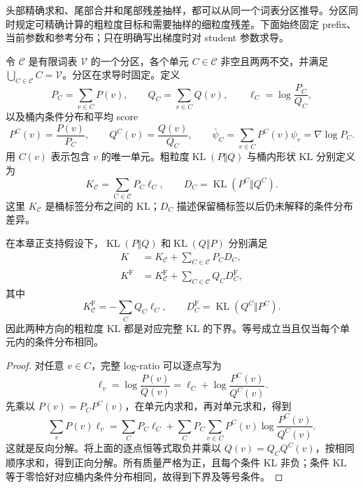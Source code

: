 \documentclass[lang=cn,scheme=chinese,openany]{../book/elegantbook}
\newcommand{\KL}{\operatorname{KL}}
\begin{document}
头部精确求和、尾部合并和尾部残差抽样，都可以从同一个词表分区推导。分区同时规定可精确计算的粗粒度目标和需要抽样的细粒度残差。下面始终固定 prefix、当前参数和参考分布；只在明确写出梯度时对 student 参数求导。

\begin{definition}[词表分区与桶内分布]
令 $\mathcal C$ 是有限词表 $\mathcal V$ 的一个分区，各个单元 $C\in\mathcal C$ 非空且两两不交，并满足 $\bigcup_{C\in\mathcal C}C=\mathcal V$。分区在求导时固定。定义
\begin{equation*}
 P_C=\sum_{v\in C}P(v),\qquad
 Q_C=\sum_{v\in C}Q(v),\qquad
 \ell_C=\log\frac{P_C}{Q_C},
\end{equation*}
以及桶内条件分布和平均 score
\begin{equation*}
 P^C(v)=\frac{P(v)}{P_C},\qquad
 Q^C(v)=\frac{Q(v)}{Q_C},\qquad
 \bar \psi_C=\sum_{v\in C}P^C(v)\psi_v=\nabla\log P_C.
\end{equation*}
用 $C(v)$ 表示包含 $v$ 的唯一单元。粗粒度$\KL(P\Vert Q)$ 与桶内形状 KL 分别定义为
\begin{equation*}
 K_{\mathcal C}=\sum_{C\in\mathcal C}P_C\ell_C,
 \qquad D_C=\KL(P^C\Vert Q^C).
\end{equation*}
这里 $K_{\mathcal C}$ 是桶标签分布之间的 KL；$D_C$ 描述保留桶标签以后仍未解释的条件分布差异。
\end{definition}

\begin{theorem}
\label{inf:thm:kl-partition-chain}
在本章正支持假设下，$\KL(P\Vert Q)$ 和$\KL(Q\Vert P)$ 分别满足
\begin{align}
 K&=K_{\mathcal C}+\sum_{C\in\mathcal C}P_CD_C,
 \label{inf:eq:kl-partition-chain-reverse}\\
 K^{\mathrm F}&=K^{\mathrm F}_{\mathcal C}
       +\sum_{C\in\mathcal C}Q_CD^{\mathrm F}_C,
 \label{inf:eq:kl-partition-chain-forward}
\end{align}
其中
\begin{equation*}
 K^{\mathrm F}_{\mathcal C}=-\sum_CQ_C\ell_C,
 \qquad D_C^{\mathrm F}=\KL(Q^C\Vert P^C).
\end{equation*}
因此两种方向的粗粒度 KL 都是对应完整 KL 的下界。等号成立当且仅当每个单元内的条件分布相同。
\end{theorem}

\begin{proof}
对任意 $v\in C$，完整 log-ratio 可以逐点写为
\begin{equation*}
 \ell_v=\log\frac{P(v)}{Q(v)}
     =\ell_C+\log\frac{P^C(v)}{Q^C(v)}.
\end{equation*}
先乘以 $P(v)=P_CP^C(v)$，在单元内求和，再对单元求和，得到
\begin{equation*}
 \sum_vP(v)\ell_v
 =\sum_CP_C\ell_C
  +\sum_CP_C\sum_{v\in C}P^C(v)
                        \log\frac{P^C(v)}{Q^C(v)}.
\end{equation*}
这就是反向分解。将上面的逐点恒等式取负并乘以 $Q(v)=Q_CQ^C(v)$，按相同顺序求和，得到正向分解。所有质量严格为正，且每个条件 KL 非负；条件 KL 等于零恰好对应桶内条件分布相同，故得到下界及等号条件。
\end{proof}
\end{document}
